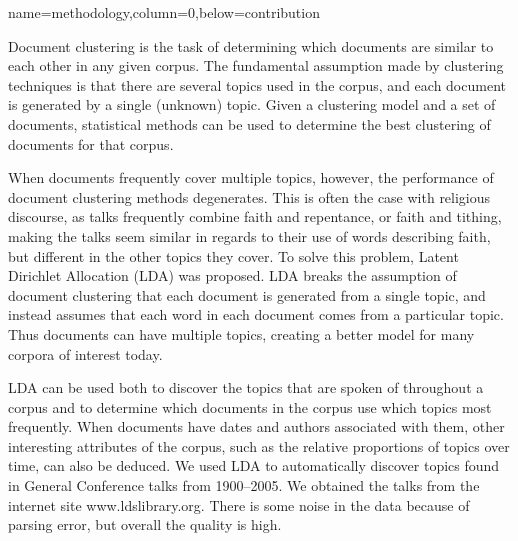 \documentclass[landscape,final]{baposter}
\begin{document}
\begin{poster}

  {name=methodology,column=0,below=contribution}{
	Document clustering is the task of determining which documents are similar
	to each other in any given corpus.  The fundamental assumption made by
	clustering techniques is that there are several topics used in the corpus,
	and each document is generated by a single (unknown) topic.  Given a
	clustering model and a set of documents, statistical methods can be used to
	determine the best clustering of documents for that corpus.

	When documents frequently cover multiple topics, however, the performance
	of document clustering methods degenerates.  This is often the case with
	religious discourse, as talks frequently combine faith and repentance, or
	faith and tithing, making the talks seem similar in regards to their use of
	words describing faith, but different in the other topics they cover.  To
	solve this problem, Latent Dirichlet Allocation (LDA) was proposed.  LDA
	breaks the assumption of document clustering that each document is
	generated from a single topic, and instead assumes that each word in each
	document comes from a particular topic.  Thus documents can have multiple
	topics, creating a better model for many corpora of interest today.

	LDA can be used both to discover the topics that are spoken of throughout a
	corpus and to determine which documents in the corpus use which topics most
	frequently.  When documents have dates and authors associated with them,
	other interesting attributes of the corpus, such as the relative
	proportions of topics over time, can also be deduced.  We used LDA to
	automatically discover topics found in General Conference talks from
	1900--2005.  We obtained the talks from the internet site
	www.ldslibrary.org.  There is some noise in the data because of parsing
	error, but overall the quality is high.

}
\end{poster}
\end{document}
